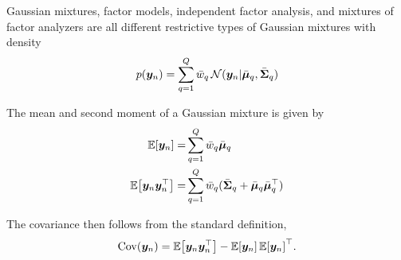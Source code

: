 \documentclass{article}
\newcommand{\obs}{y}
\newcommand{\obsvec}{\bm{\obs}}
\newcommand{\mean}{\mu}
\newcommand{\meanvec}{\bm{\mean}}
\newcommand{\weight}{w}
\newcommand{\compweight}{\bar{\weight}}
\newcommand{\compmeanvec}{\bar{\meanvec}}
\newcommand{\compcov}{\bar{\bm{\Sigma}}}
\begin{document}
Gaussian mixtures, factor models, independent factor analysis, and mixtures of factor analyzers are all different restrictive types of Gaussian mixtures with density
\begin{equation}
p(\obsvec_n)=\sum_{q=1}^{Q}\compweight_{q}\gaussrnd(\obsvec_n|\compmeanvec_q,\compcov_q)
\end{equation} 

The mean and second moment of a Gaussian mixture is given by
\begin{align}
\E{\obsvec_n}=&\sum_{q=1}^{Q}\compweight_q\compmeanvec_q\\
\E{\obsvec_n\obsvec_n\T}=&\sum_{q=1}^{Q}\compweight_q(\compcov_q + \compmeanvec_q\compmeanvec_q\T)
\end{align}

The covariance then follows from the standard definition,
\begin{equation}
\Cov{\obsvec_n}=\E{\obsvec_n\obsvec_n\T}-\E{\obsvec_n}\E{\obsvec_n}\T.
\end{equation}
\end{document}
